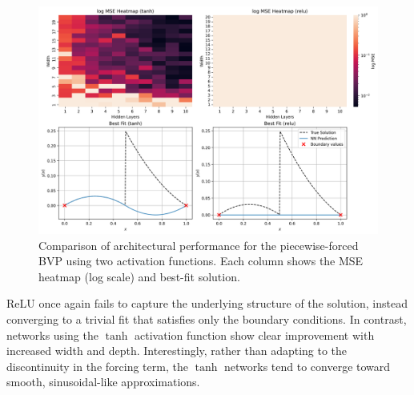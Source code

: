 \begin{figure}[h]
    \centering
    \includegraphics[width=\textwidth]{graphics/bvp_piecewise_combined.png}
    \caption{Comparison of architectural performance for the piecewise-forced BVP using two 
    activation functions. Each column shows the MSE heatmap (log scale) and best-fit solution.}
    \label{fig:bvp_piecewise_sidebyside}
\end{figure}

ReLU once again fails to capture the underlying structure of the solution, instead converging to a 
trivial fit that satisfies only the boundary conditions. In contrast, networks using the 
\(\tanh\) activation function show clear improvement with increased width and depth. 
Interestingly, rather than adapting to the discontinuity in the forcing term, the 
\(\tanh\) networks tend to converge toward smooth, sinusoidal-like approximations.
